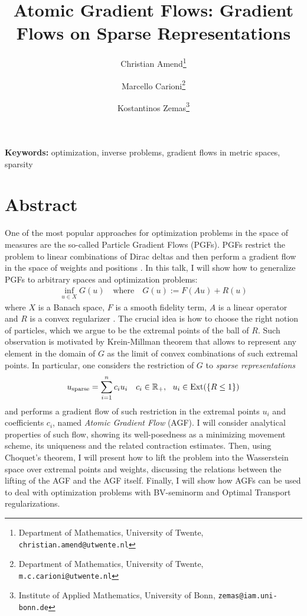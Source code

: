 \documentclass[11pt]{article}
\title{\bfseries Atomic Gradient Flows: Gradient Flows on Sparse Representations}
\author{
Christian Amend\thanks{Department of Mathematics, University of Twente,
\texttt{christian.amend@utwente.nl}}
\and
Marcello Carioni\thanks{Department of Mathematics, University of Twente,
\texttt{m.c.carioni@utwente.nl}}
\and
Kostantinos Zemas\thanks{Institute of Applied Mathematics, University of Bonn,
\texttt{zemas@iam.uni-bonn.de}}
}
\date{}
\begin{document}
\maketitle

\vspace{-1em}

\noindent
\textbf{Keywords:}
optimization, inverse problems, gradient flows in metric spaces, sparsity

\vspace{0.5em}


\vspace{1em}

\section*{Abstract}

One of the most popular approaches for optimization problems in the space of measures are the so-called Particle Gradient Flows (PGFs). PGFs restrict the problem to linear combinations of Dirac deltas and then perform a gradient flow in the space of weights and positions \cite{Chizat}. In this talk, I will show how to generalize PGFs to arbitrary spaces and optimization problems:
\begin{align*}
\inf_{u \in X} G(u) \quad \text{where} \quad  G(u) := F(Au) + R(u)
\end{align*}
where $X$ is a Banach space, $F$ is a smooth fidelity term, $A$ is a linear operator and $R$ is a convex regularizer \cite{atomic}.
The crucial idea is how to choose the right notion of particles, which we argue to be the extremal points of the ball of $R$. Such observation is motivated by Krein-Millman theorem that allows to represent any element in the domain of $G$ as the limit of convex combinations of such extremal points. In particular, one considers the restriction of $G$ to \emph{sparse representations}
\begin{align*}
u_{\rm sparse} = \sum_{i=1}^n c_i u_i \quad c_i \in \mathbb{R}_+, \ \ u_i \in {\rm Ext}(\{R \leq 1\}) 
\end{align*} 
and performs a gradient flow of such restriction in the extremal points $u_i$ and coefficients $c_i$, named \emph{Atomic Gradient Flow} (AGF). I will consider analytical properties of such flow, showing its well-posedness as a minimizing movement scheme, its uniqueness and the related contraction estimates. Then, using Choquet’s theorem, I will present how to lift the problem into the Wasserstein space over extremal points and weights, discussing the relations between the lifting of the AGF and the AGF itself. 
Finally, I will show how AGFs can be used to deal with optimization problems with BV-seminorm and Optimal Transport regularizations.  
\end{document}
